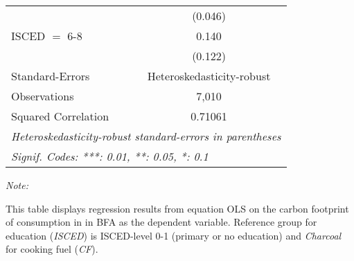 \begin{table}[htbp!]
\begin{adjustbox}{width = 1\textwidth, max height = 0.95\textheight, center}
\begin{threeparttable}[b]
\begin{tabular}{lc}
                                & (0.046)\\   
            ISCED $=$ 6-8       & 0.140\\   
                                & (0.122)\\   
            \midrule 
            Standard-Errors     & Heteroskedasticity-robust \\   
            Observations        & 7,010\\  
            Squared Correlation & 0.71061\\  
            \midrule \midrule
            \multicolumn{2}{l}{\emph{Heteroskedasticity-robust standard-errors in parentheses}}\\
            \multicolumn{2}{l}{\emph{Signif. Codes: ***: 0.01, **: 0.05, *: 0.1}}\\
         \end{tabular}
         
         \begin{tablenotes}\item \medskip \textit{Note:}
            \item This table displays regression results from equation OLS on the carbon footprint of consumption in  in BFA as the dependent variable.  Reference group for education (\textit{ISCED}) is ISCED-level 0-1 (primary or no education) and \textit{Charcoal} for cooking fuel (\textit{CF}).
         \end{tablenotes}
      \end{threeparttable}
   \end{adjustbox}
\end{table}


